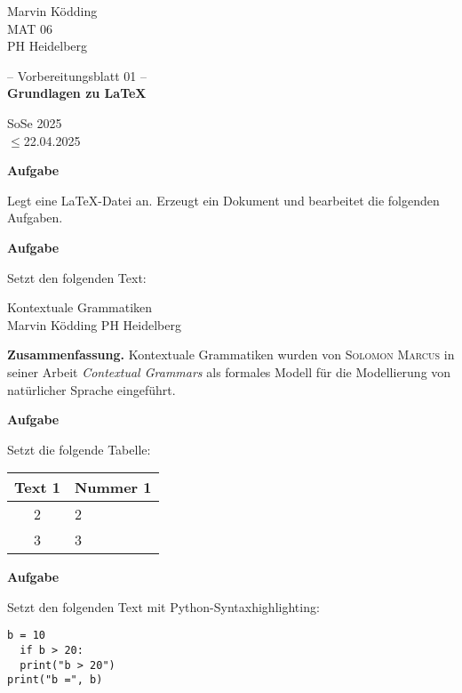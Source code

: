 \documentclass[a4paper, 12pt]{article}
\renewcommand{\date}{$\leq$22.04.2025}
\newcommand{\klasse}{MAT 06}
\newcommand{\institute}{PH Heidelberg}
\newcommand{\topic}{Grundlagen zu \LaTeX}
\newcommand{\semester}{SoSe 2025}
\newcommand{\blatt}{01}
\newcounter{Aufgabe}
\newenvironment{aufgabe}{\addtocounter{Aufgabe}{1}%
	\textbf{Aufgabe \theAufgabe}
	
	\vspace*{-0.3em}}{\medskip}
\begin{document}
	\pagestyle{empty}
	\begin{minipage}{0.2\textwidth}
		Marvin Ködding\\\scriptsize \klasse\\\institute
	\end{minipage}
	\begin{minipage}{.6\textwidth}
		\centering
		-- Vorbereitungsblatt \blatt{} --\\\textbf{\topic}
	\end{minipage}
	\begin{minipage}{.2\textwidth}
		\flushright \semester\\\scriptsize \date
	\end{minipage}
	
	\vspace*{1cm}
	
	\begin{aufgabe}
		Legt eine \LaTeX-Datei an. Erzeugt ein Dokument und bearbeitet die folgenden Aufgaben.
	\end{aufgabe}
	
	\begin{aufgabe}
		Setzt den folgenden Text:
		
		\begin{center}
			Kontextuale Grammatiken\\
			\tiny Marvin Ködding \qquad PH Heidelberg
		\end{center}
		
		\textbf{Zusammenfassung.} \textsf{Kontextuale Grammatiken} wurden von \textsc{Solomon Marcus} in seiner Arbeit \textit{Contextual Grammars} als formales Modell für die Modellierung von \glqq{}natürlicher Sprache\grqq{} eingeführt.
	\end{aufgabe}
	
	\begin{aufgabe}
		Setzt die folgende Tabelle:
		
		\begin{center}
			\begin{tabular}{c|l}
				Text 1 & Nummer 1\\
				\hline
				2 & 2\\
				\hline
				3 & 3
			\end{tabular}
		\end{center}
	\end{aufgabe}
	
	\begin{aufgabe}
		Setzt den folgenden Text mit Python-Syntaxhighlighting:
		
		\begin{verbatim}
b = 10
  if b > 20:
  print("b > 20")
print("b =", b)
		\end{verbatim}
	\end{aufgabe}
\end{document}
